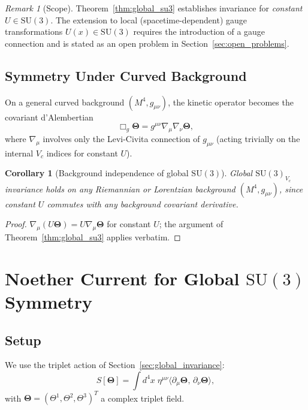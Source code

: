 \documentclass[12pt,a4paper]{article}
\newtheorem{corollary}[theorem]{Corollary}
\theoremstyle{remark}
\newtheorem{remark}[theorem]{Remark}
\begin{document}
\begin{remark}[Scope]
  Theorem~\ref{thm:global_su3} establishes invariance for \emph{constant}
  $U\in\mathrm{SU}(3)$.  The extension to local (spacetime-dependent) gauge
  transformations $U(x)\in\mathrm{SU}(3)$ requires the introduction of a
  gauge connection and is stated as an open problem in
  Section~\ref{sec:open_problems}.
\end{remark}

\subsection{Symmetry Under Curved Background}

On a general curved background $(M^4,g_{\mu\nu})$, the kinetic operator
becomes the covariant d'Alembertian
\begin{equation}
  \Box_g\boldsymbol{\Theta} = g^{\mu\nu}\nabla_\mu\nabla_\nu\boldsymbol{\Theta},
\end{equation}
where $\nabla_\mu$ involves only the Levi-Civita connection of $g_{\mu\nu}$
(acting trivially on the internal $V_c$ indices for constant $U$).

\begin{corollary}[Background independence of global $\mathrm{SU}(3)$]
  \label{cor:curved_invariance}
  Global $\mathrm{SU}(3)_{V_c}$ invariance holds on any Riemannian or
  Lorentzian background $(M^4,g_{\mu\nu})$, since constant $U$ commutes
  with any background covariant derivative.
\end{corollary}

\begin{proof}
  $\nabla_\mu(U\boldsymbol{\Theta}) = U\nabla_\mu\boldsymbol{\Theta}$ for
  constant $U$; the argument of Theorem~\ref{thm:global_su3} applies verbatim.
\end{proof}

\section{Noether Current for Global $\mathrm{SU}(3)$ Symmetry}
\label{sec:noether_current}

\subsection{Setup}

We use the triplet action of Section~\ref{sec:global_invariance}:
\begin{equation}
  S[\boldsymbol{\Theta}]
  = \int d^4x\;
    \eta^{\mu\nu}
    \langle\partial_\mu\boldsymbol{\Theta},\,\partial_\nu\boldsymbol{\Theta}\rangle,
\end{equation}
with $\boldsymbol{\Theta}=(\Theta^1,\Theta^2,\Theta^3)^T$ a complex triplet field.
\end{document}
